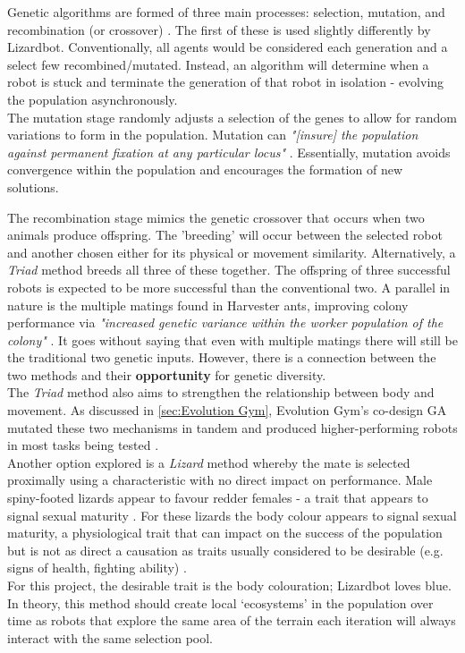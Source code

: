 \documentclass{article}
\begin{document}
Genetic algorithms are formed of three main processes: selection, mutation, and recombination (or crossover) . The first of these is used slightly differently by Lizardbot. Conventionally, all agents would be considered each generation and a select few recombined/mutated. Instead, an algorithm will determine when a robot is stuck and terminate the generation of that robot in isolation - evolving the population asynchronously. \\

The mutation stage randomly adjusts a selection of the genes to allow for random variations to form in the population. Mutation can \textit{"[insure]
the population against permanent fixation at any particular locus"} . Essentially, mutation avoids convergence within the population and encourages the formation of new solutions. 

The recombination stage mimics the genetic crossover that occurs when two animals produce offspring. The 'breeding' will occur between the selected robot and another chosen either for its physical or movement similarity. Alternatively, a \textit{Triad} method breeds all three of these together. The offspring of three successful robots is expected to be more successful than the conventional two. A parallel in nature is the multiple matings found in Harvester ants, improving colony performance via \textit{"increased genetic variance within the worker population of the colony"} . It goes without saying that even with multiple matings there will still be the traditional two genetic inputs. However, there is a connection between the two methods and their \textbf{opportunity} for genetic diversity. \\
The \textit{Triad} method also aims to strengthen the relationship between body and movement. As discussed in \ref{sec:Evolution Gym}, Evolution Gym's co-design GA mutated these two mechanisms in tandem and produced higher-performing robots in most tasks being tested .\\

Another option explored is a \textit{Lizard} method whereby the mate is selected proximally using a characteristic with no direct impact on performance. Male spiny-footed lizards appear to favour redder females - a trait that appears to signal sexual maturity . For these lizards the body colour appears to signal sexual maturity, a physiological trait that can impact on the success of the population but is not as direct a causation as traits usually considered to be desirable (e.g. signs of health, fighting ability) .\\
For this project, the desirable trait is the body colouration; Lizardbot loves blue. In theory, this method should create local ‘ecosystems’ in the population over time as robots that explore the same area of the terrain each iteration will always interact with the same selection pool. \\
\end{document}

